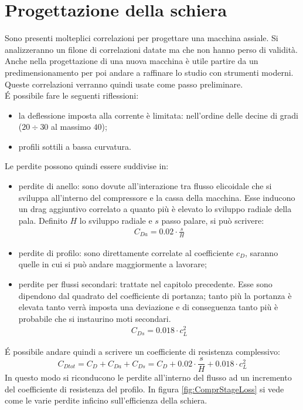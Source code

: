 \section{Progettazione della schiera}
Sono presenti molteplici correlazioni per progettare una macchina assiale. Si analizzeranno un filone di correlazioni datate ma che non hanno perso di validità. Anche nella progettazione di una nuova macchina è utile partire da un predimensionamento per poi andare a raffinare lo studio con strumenti moderni. Queste correlazioni verranno quindi usate come passo preliminare.\\
\'E possibile fare le seguenti riflessioni:
\begin{itemize}
\item la deflessione imposta alla corrente è limitata: nell'ordine delle decine di gradi ($20 \div 30$ al massimo $40$);
\item profili sottili a bassa curvatura.
\end{itemize}
Le perdite possono quindi essere suddivise in:
\begin{itemize}
\item perdite di anello: sono dovute all'interazione tra flusso elicoidale che si sviluppa all'interno del compressore e la cassa della macchina. Esse inducono un drag aggiuntivo correlato a quanto più è elevato lo sviluppo radiale della pala. Definito $H$ lo sviluppo radiale e $s$ passo palare, si può scrivere:
\begin{align*}
C_{Da} = 0.02 \cdot \frac{s}{H}
\end{align*}
\item perdite di profilo: sono direttamente correlate al coefficiente $c_D$, saranno quelle in cui si può andare maggiormente a lavorare;
\item perdite per flussi secondari: trattate nel capitolo precedente. Esse sono dipendono dal quadrato del coefficiente di portanza; tanto più la portanza è elevata tanto verrà imposta una deviazione e di conseguenza tanto più è probabile che si instaurino moti secondari.
\begin{align*}
C_{Ds} = 0.018 \cdot c_L^2
\end{align*}
\end{itemize}
\'E possibile andare quindi a scrivere un coefficiente di resistenza complessivo:
\begin{equation}
C_{Dtot} = C_D + C_{Da} + C_{Ds} = C_D + 0.02 \cdot \frac{s}{H} + 0.018 \cdot c_L^2
\label{eq:Cdtot}
\end{equation}
In questo modo si riconducono le perdite all'interno del flusso ad un incremento del coefficiente di resistenza del profilo. In figura \ref{fig:ComprStageLoss} si vede come le varie perdite inficino sull'efficienza della schiera.
